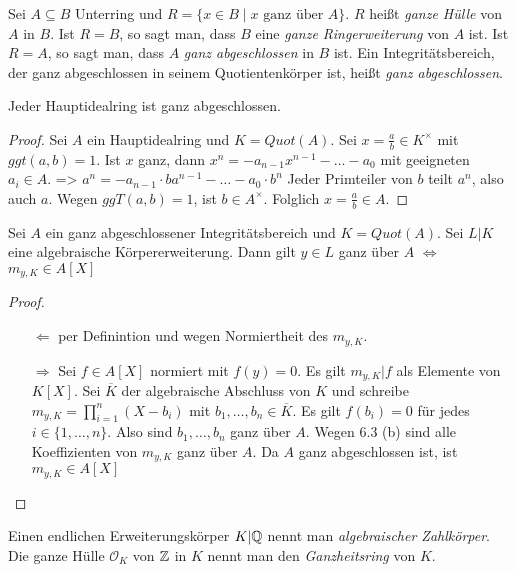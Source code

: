 \documentclass[../main.tex]{subfiles}
\begin{document}
\begin{definition}
    Sei $A\subseteq B$ Unterring und $R=\{x\in B\mid \text{$x$ ganz über $A$}\}$.
    $R$ heißt \emph{ganze Hülle} von $A$ in $B$.
    Ist $R=B$, so sagt man, dass $B$ eine \emph{ganze Ringerweiterung} von $A$ ist.
    Ist $R=A$, so sagt man, dass $A$ \emph{ganz abgeschlossen} in $B$ ist.
    Ein Integritätsbereich, der ganz abgeschlossen in seinem Quotientenkörper ist, heißt \emph{ganz abgeschlossen}.
\end{definition}
\begin{lemma}
    Jeder Hauptidealring ist ganz abgeschlossen.
\end{lemma}
\begin{proof}
    Sei $A$ ein Hauptidealring und $K=Quot(A)$.
    Sei $x=\frac{a}{b}\in K^\times$ mit $ggt(a,b) = 1$. Ist $x$ ganz, dann $x^n = -a_{n-1}x^{n-1}-\dots -a_0$ mit geeigneten $a_i\in A$.
    => $a^n = -a_{n-1} \cdot ba^{n-1}-\dots - a_0 \cdot b^n$
    Jeder Primteiler von $b$ teilt $a^n$, also auch $a$. Wegen $ggT(a,b)=1$, ist $b\in A^\times$. Folglich $x=\frac{a}{b}\in A$.
\end{proof}
\begin{theorem}
    Sei $A$ ein ganz abgeschlossener Integritätsbereich und $K=Quot(A)$. Sei $L|K$ eine algebraische Körpererweiterung.
    Dann gilt $y\in L$ ganz über $A$ $\Leftrightarrow$ $m_{y,K}\in A[X]$
\end{theorem}
\begin{proof}$ $
    \begin{itemize}
        \item[$\Leftarrow$] per Definintion und wegen Normiertheit des $m_{y,K}$.
        \item[$\Rightarrow$] Sei $f\in A[X]$ normiert mit $f(y) = 0$.
        Es gilt $m_{y,K}|f$ als Elemente von $K[X]$.
        Sei $\overline{K}$ der algebraische Abschluss von $K$ und schreibe $m_{y,K}=\prod_{i=1}^n (X-b_i)$ mit $b_1,\dots,b_n\in \overline{K}$.
        Es gilt $f(b_i)=0$ für jedes $i\in\{1,\dots,n\}$.
        Also sind $b_1,\dots,b_n$ ganz über $A$.
        Wegen 6.3 (b) sind alle Koeffizienten von $m_{y,K}$ ganz über $A$.
        Da $A$ ganz abgeschlossen ist, ist $m_{y,K}\in A[X]$
    \end{itemize}
\end{proof}
\begin{definition}
    Einen endlichen Erweiterungskörper $K|\mathbb{Q}$ nennt man \emph{algebraischer Zahlkörper}.
    Die ganze Hülle $\mathcal{O}_K$ von $\mathbb{Z}$ in $K$ nennt man den \emph{Ganzheitsring} von $K$.
\end{definition}
\end{document}
